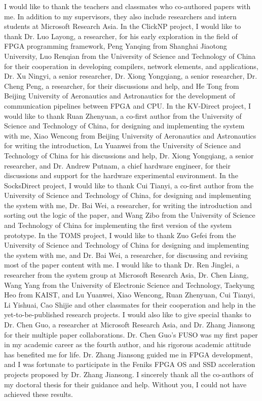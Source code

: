 \begin{acknowledgements}
I would like to thank the teachers and classmates who co-authored papers with me. In addition to my supervisors, they also include researchers and intern students at Microsoft Research Asia. In the ClickNP project, I would like to thank Dr. Luo Layong, a researcher, for his early exploration in the field of FPGA programming framework, Peng Yanqing from Shanghai Jiaotong University, Luo Renqian from the University of Science and Technology of China for their cooperation in developing compilers, network elements, and applications, Dr. Xu Ningyi, a senior researcher, Dr. Xiong Yongqiang, a senior researcher, Dr. Cheng Peng, a researcher, for their discussions and help, and He Tong from Beijing University of Aeronautics and Astronautics for the development of communication pipelines between FPGA and CPU. In the KV-Direct project, I would like to thank Ruan Zhenyuan, a co-first author from the University of Science and Technology of China, for designing and implementing the system with me, Xiao Wencong from Beijing University of Aeronautics and Astronautics for writing the introduction, Lu Yuanwei from the University of Science and Technology of China for his discussions and help, Dr. Xiong Yongqiang, a senior researcher, and Dr. Andrew Putnam, a chief hardware engineer, for their discussions and support for the hardware experimental environment. In the SocksDirect project, I would like to thank Cui Tianyi, a co-first author from the University of Science and Technology of China, for designing and implementing the system with me, Dr. Bai Wei, a researcher, for writing the introduction and sorting out the logic of the paper, and Wang Zibo from the University of Science and Technology of China for implementing the first version of the system prototype. In the TOMS project, I would like to thank Zuo Gefei from the University of Science and Technology of China for designing and implementing the system with me, and Dr. Bai Wei, a researcher, for discussing and revising most of the paper content with me. I would like to thank Dr. Ren Jinglei, a researcher from the system group at Microsoft Research Asia, Dr. Chen Liang, Wang Yang from the University of Electronic Science and Technology, Taekyung Heo from KAIST, and Lu Yuanwei, Xiao Wencong, Ruan Zhenyuan, Cui Tianyi, Li Yishuai, Cao Shijie and other classmates for their cooperation and help in the yet-to-be-published research projects. I would also like to give special thanks to Dr. Chen Guo, a researcher at Microsoft Research Asia, and Dr. Zhang Jiansong for their multiple paper collaborations. Dr. Chen Guo's FUSO was my first paper in my academic career as the fourth author, and his rigorous academic attitude has benefited me for life. Dr. Zhang Jiansong guided me in FPGA development, and I was fortunate to participate in the Feniks FPGA OS and SSD acceleration projects proposed by Dr. Zhang Jiansong. I sincerely thank all the co-authors of my doctoral thesis for their guidance and help. Without you, I could not have achieved these results.

\end{acknowledgements}

